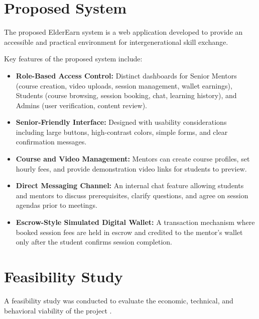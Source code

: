 \documentclass[12pt,a4paper]{report}
\begin{document}
\section{Proposed System}
The proposed ElderEarn system is a web application developed to provide an accessible and practical environment for intergenerational skill exchange.

Key features of the proposed system include:
\begin{itemize}[leftmargin=1.5em, itemsep=2pt]
  \item \textbf{Role-Based Access Control:} Distinct dashboards for Senior Mentors (course creation, video uploads, session management, wallet earnings), Students (course browsing, session booking, chat, learning history), and Admins (user verification, content review).
  \item \textbf{Senior-Friendly Interface:} Designed with usability considerations including large buttons, high-contrast colors, simple forms, and clear confirmation messages.
  \item \textbf{Course and Video Management:} Mentors can create course profiles, set hourly fees, and provide demonstration video links for students to preview.
  \item \textbf{Direct Messaging Channel:} An internal chat feature allowing students and mentors to discuss prerequisites, clarify questions, and agree on session agendas prior to meetings.
  \item \textbf{Escrow-Style Simulated Digital Wallet:} A transaction mechanism where booked session fees are held in escrow and credited to the mentor's wallet only after the student confirms session completion.
\end{itemize}

\section{Feasibility Study}
A feasibility study was conducted to evaluate the economic, technical, and behavioral viability of the project \cite{pressman}.
\end{document}
